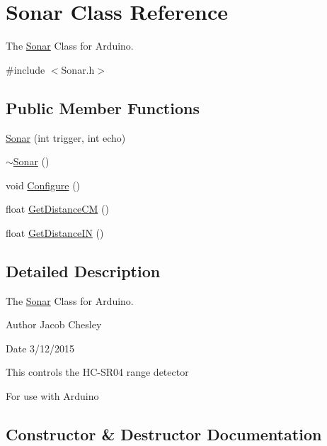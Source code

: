 \hypertarget{class_sonar}{}\section{Sonar Class Reference}
\label{class_sonar}


The \hyperlink{class_sonar}{Sonar} Class for Arduino.  




{\ttfamily \#include $<$Sonar.\+h$>$}

\subsection*{Public Member Functions}
\begin{DoxyCompactItemize}
\item 
\hyperlink{class_sonar_afc823e46ba759959c5a949dd9197ec52}{Sonar} (int trigger, int echo)
\item 
\hyperlink{class_sonar_af344645fcd3ca9c20bdaf8342a87850b}{$\sim$\+Sonar} ()
\item 
void \hyperlink{class_sonar_aad35f37175cc3f861e4de0198aef025a}{Configure} ()
\item 
float \hyperlink{class_sonar_ab78634bac5474385fbbd51e8fbe4bad8}{Get\+Distance\+C\+M} ()
\item 
float \hyperlink{class_sonar_aaaf12e1d678f8d754345f04fe9f1982d}{Get\+Distance\+I\+N} ()
\end{DoxyCompactItemize}


\subsection{Detailed Description}
The \hyperlink{class_sonar}{Sonar} Class for Arduino. 

\begin{DoxyAuthor}{Author}
Jacob Chesley 
\end{DoxyAuthor}
\begin{DoxyDate}{Date}
3/12/2015
\end{DoxyDate}
This controls the H\+C-\/\+S\+R04 range detector

For use with Arduino 

\subsection{Constructor \& Destructor Documentation}
\hypertarget{class_sonar_afc823e46ba759959c5a949dd9197ec52}{}
